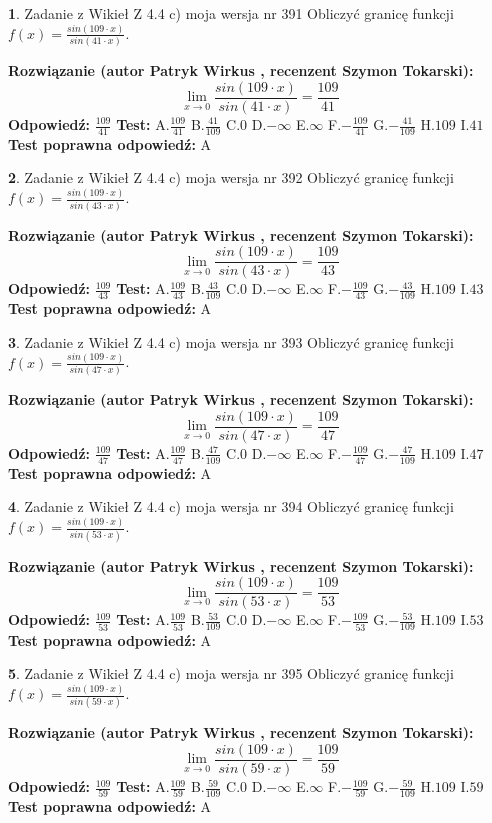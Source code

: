 \documentclass[12pt, a4paper]{article}
\theoremstyle{definition} %
\newtheorem{zad}{}
\newcommand{\zadStart}[1]{\begin{zad}#1\newline}
\newcommand{\zadStop}{\end{zad}}
\newcommand{\rozwStart}[2]{\noindent \textbf{Rozwiązanie (autor #1 , recenzent #2): }\newline}
\newcommand{\rozwStop}{\newline}
\newcommand{\odpStart}{\noindent \textbf{Odpowiedź:}\newline}
\newcommand{\odpStop}{\newline}
\newcommand{\testStart}{\noindent \textbf{Test:}\newline}
\newcommand{\testStop}{\newline}
\newcommand{\kluczStart}{\noindent \textbf{Test poprawna odpowiedź:}\newline}
\newcommand{\kluczStop}{\newline}
\begin{document}
\zadStart{Zadanie z Wikieł Z 4.4 c) moja wersja nr 391}
Obliczyć granicę funkcji $f(x)=\frac{sin(109\cdot x)}{sin(41\cdot x)}$.
\zadStop
\rozwStart{Patryk Wirkus}{Szymon Tokarski}
$$\lim\limits_{x\to 0}\frac{sin(109\cdot x)}{sin(41\cdot x)}=
\frac{109}{41}$$
\rozwStop
\odpStart
$\frac{109}{41}$
\odpStop
\testStart
A.$\frac{109}{41}$
B.$\frac{41}{109}$
C.$0$
D.$-\infty$
E.$\infty$
F.$-\frac{109}{41}$
G.$-\frac{41}{109}$
H.$109$
I.$41$
\testStop
\kluczStart
A
\kluczStop



\zadStart{Zadanie z Wikieł Z 4.4 c) moja wersja nr 392}
Obliczyć granicę funkcji $f(x)=\frac{sin(109\cdot x)}{sin(43\cdot x)}$.
\zadStop
\rozwStart{Patryk Wirkus}{Szymon Tokarski}
$$\lim\limits_{x\to 0}\frac{sin(109\cdot x)}{sin(43\cdot x)}=
\frac{109}{43}$$
\rozwStop
\odpStart
$\frac{109}{43}$
\odpStop
\testStart
A.$\frac{109}{43}$
B.$\frac{43}{109}$
C.$0$
D.$-\infty$
E.$\infty$
F.$-\frac{109}{43}$
G.$-\frac{43}{109}$
H.$109$
I.$43$
\testStop
\kluczStart
A
\kluczStop



\zadStart{Zadanie z Wikieł Z 4.4 c) moja wersja nr 393}
Obliczyć granicę funkcji $f(x)=\frac{sin(109\cdot x)}{sin(47\cdot x)}$.
\zadStop
\rozwStart{Patryk Wirkus}{Szymon Tokarski}
$$\lim\limits_{x\to 0}\frac{sin(109\cdot x)}{sin(47\cdot x)}=
\frac{109}{47}$$
\rozwStop
\odpStart
$\frac{109}{47}$
\odpStop
\testStart
A.$\frac{109}{47}$
B.$\frac{47}{109}$
C.$0$
D.$-\infty$
E.$\infty$
F.$-\frac{109}{47}$
G.$-\frac{47}{109}$
H.$109$
I.$47$
\testStop
\kluczStart
A
\kluczStop



\zadStart{Zadanie z Wikieł Z 4.4 c) moja wersja nr 394}
Obliczyć granicę funkcji $f(x)=\frac{sin(109\cdot x)}{sin(53\cdot x)}$.
\zadStop
\rozwStart{Patryk Wirkus}{Szymon Tokarski}
$$\lim\limits_{x\to 0}\frac{sin(109\cdot x)}{sin(53\cdot x)}=
\frac{109}{53}$$
\rozwStop
\odpStart
$\frac{109}{53}$
\odpStop
\testStart
A.$\frac{109}{53}$
B.$\frac{53}{109}$
C.$0$
D.$-\infty$
E.$\infty$
F.$-\frac{109}{53}$
G.$-\frac{53}{109}$
H.$109$
I.$53$
\testStop
\kluczStart
A
\kluczStop



\zadStart{Zadanie z Wikieł Z 4.4 c) moja wersja nr 395}
Obliczyć granicę funkcji $f(x)=\frac{sin(109\cdot x)}{sin(59\cdot x)}$.
\zadStop
\rozwStart{Patryk Wirkus}{Szymon Tokarski}
$$\lim\limits_{x\to 0}\frac{sin(109\cdot x)}{sin(59\cdot x)}=
\frac{109}{59}$$
\rozwStop
\odpStart
$\frac{109}{59}$
\odpStop
\testStart
A.$\frac{109}{59}$
B.$\frac{59}{109}$
C.$0$
D.$-\infty$
E.$\infty$
F.$-\frac{109}{59}$
G.$-\frac{59}{109}$
H.$109$
I.$59$
\testStop
\kluczStart
A
\kluczStop
\end{document}
